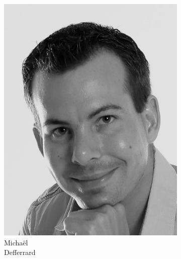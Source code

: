 \documentclass[aspectratio=169]{beamer}
\begin{document}
\begin{frame}
\begin{figure}
\begin{subfigure}[b]{0.14\linewidth}
			\includegraphics[width=\linewidth]{picture_michael}
			\caption*{Michaël\\Defferrard}
		\end{subfigure}
		\hfill
		\begin{subfigure}[b]{0.14\linewidth}

\end{subfigure}
\end{figure}
\end{frame}
\end{document}
